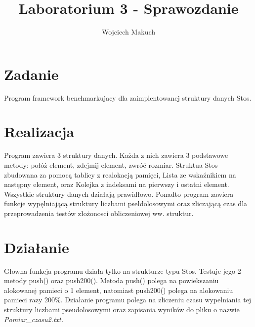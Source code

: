 

\title{Laboratorium 3 - Sprawozdanie}
\author{Wojciech Makuch}

\maketitle
\section{Zadanie}
Program framework benchmarkujacy dla zaimplentowanej struktury danych Stos.
\section{Realizacja}
Program zawiera 3 struktury danych. Każda z nich zawiera 3 podstawowe metody: połóż element, zdejmij element, zwróć rozmiar. Struktua Stos zbudowana za pomocą tablicy z realokacją pamięci, Lista ze wskaźnikiem na następny element, oraz Kolejka z indeksami na pierwszy i ostatni element. Wszystkie struktury danych działają prawidłowo.
Ponadto program zawiera funkcje wypęłniającą struktury liczbami psełdolosowymi oraz zliczającą czas dla przeprowadzenia testów złożonosci obliczeniowej ww. struktur.
\section{Działanie}
Głowna funkcja programu działa tylko na strukturze typu Stos. Testuje jego 2 metody push() oraz push200(). Metoda push() polega na powiekszaniu alokowanej pamieci o 1 element, natomiast push200() polega na alokowaniu pamieci razy 200\%. Działanie programu polega na zliczeniu czasu wypelniania tej struktury liczbami pseudolosowymi oraz zapisania wyników do pliku o nazwie \textsl{Pomiar\_czasu2.txt.}
